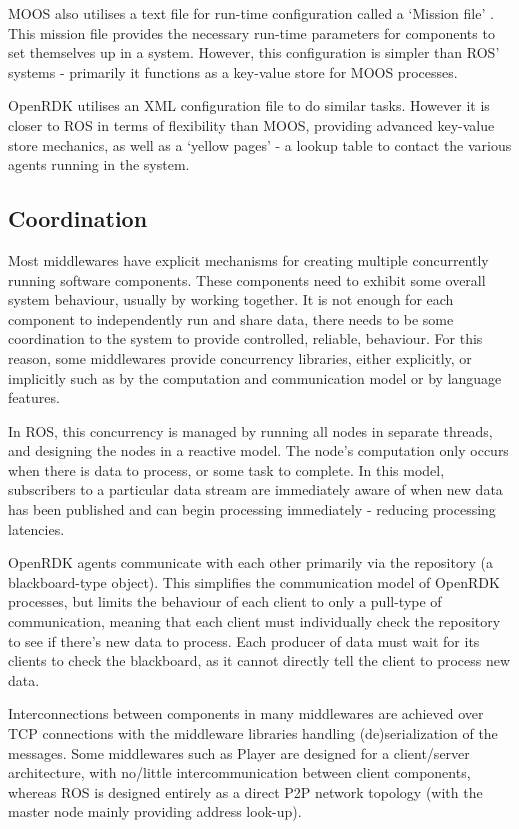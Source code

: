 \documentclass[../dissertation.tex]{subfiles}
\begin{document}
MOOS also utilises a text file for run-time configuration called a `Mission file' \cite{newman2009introduction}. This mission file provides the necessary run-time parameters for components to set themselves up in a system. However, this configuration is simpler than ROS' systems - primarily it functions as a key-value store for MOOS processes.

OpenRDK utilises an XML configuration file to do similar tasks. However it is closer to ROS in terms of flexibility than MOOS, providing advanced key-value store mechanics, as well as a `yellow pages' - a lookup table to contact the various agents running in the system.

\subsection{Coordination}
\label{coordination-section}

Most middlewares have explicit mechanisms for creating multiple concurrently running software components. These components need to exhibit some overall system behaviour, usually by working together. It is not enough for each component to independently run and share data, there needs to be some coordination to the system to provide controlled, reliable, behaviour. For this reason, some middlewares provide concurrency libraries, either explicitly, or implicitly such as by the computation and communication model or by language features.

In ROS, this concurrency is managed by running all nodes in separate threads, and designing the nodes in a reactive model. The node's computation only occurs when there is data to process, or some task to complete. In this model, subscribers to a particular data stream are immediately aware of when new data has been published and can begin processing immediately - reducing processing latencies.

OpenRDK agents communicate with each other primarily via the repository (a blackboard-type object). This simplifies the communication model of OpenRDK processes, but limits the behaviour of each client to only a pull-type of communication, meaning that each client must individually check the repository to see if there's new data to process. Each producer of data must wait for its clients to check the blackboard, as it cannot directly tell the client to process new data.

Interconnections between components in many middlewares are achieved over TCP connections with the middleware libraries handling (de)serialization of the messages. Some middlewares such as Player are designed for a client/server architecture, with no/little intercommunication between client components, whereas ROS is designed entirely as a direct P2P network topology (with the master node mainly providing address look-up).
\end{document}
